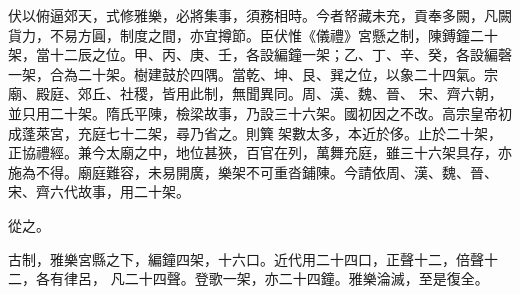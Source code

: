 \begin{pinyinscope}
 伏以俯逼郊天，式修雅樂，必將集事，須務相時。今者帑藏未充，貢奉多闕，凡闕貨力，不易方圓，制度之間，亦宜撙節。臣伏惟《儀禮》宮懸之制，陳鎛鐘二十架，當十二辰之位。甲、丙、庚、壬，各設編鐘一架；乙、丁、辛、癸，各設編磬一架，合為二十架。樹建鼓於四隅。當乾、坤、艮、巽之位，以象二十四氣。宗廟、殿庭、郊丘、社稷，皆用此制，無聞異同。周、漢、魏、晉、
 宋、齊六朝，並只用二十架。隋氏平陳，檢梁故事，乃設三十六架。國初因之不改。高宗皇帝初成蓬萊宮，充庭七十二架，尋乃省之。則簨架數太多，本近於侈。止於二十架，正協禮經。兼今太廟之中，地位甚狹，百官在列，萬舞充庭，雖三十六架具存，亦施為不得。廟庭難容，未易開廣，樂架不可重沓鋪陳。今請依周、漢、魏、晉、宋、齊六代故事，用二十架。



 從之。



 古制，雅樂宮縣之下，編鐘四架，十六口。近代用二十四口，正聲十二，倍聲十二，各有律呂，
 凡二十四聲。登歌一架，亦二十四鐘。雅樂淪滅，至是復全。



\end{pinyinscope}